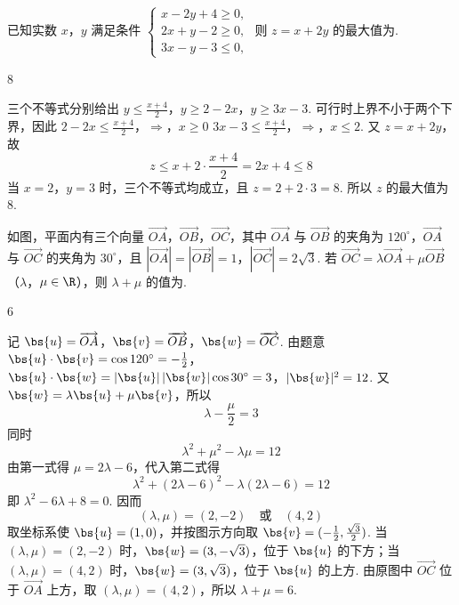 \begin{problem}
已知实数 \(x\)，\(y\) 满足条件 \(\begin{cases}
x - 2y + 4 \geqslant 0,\\
2x + y - 2 \geqslant 0,\\
3x - y - 3 \leqslant 0,
\end{cases}\) 则 \(z = x + 2y\) 的最大值为\fillinblank{}.
\end{problem}

\begin{answer}
\(8\)
\end{answer}

\begin{solution}
三个不等式分别给出 \(y\leqslant\frac{x+4}{2}\)，\(y\geqslant2-2x\)，\(y\geqslant3x-3\).
可行时上界不小于两个下界，因此
\(2-2x\leqslant\frac{x+4}{2}\)，\(\Longrightarrow\)，\(x\geqslant0\)
\(3x-3\leqslant\frac{x+4}{2}\)，\(\Longrightarrow\)，\(x\leqslant2\).
又 \(z=x+2y\)，故
\[
z\leqslant x+2\cdot\frac{x+4}{2}=2x+4\leqslant8
\]
当 \(x=2\)，\(y=3\) 时，三个不等式均成立，且 \(z=2+2\cdot3=8\). 所以 \(z\) 的最大值为 \(8\).
\end{solution}

\begin{problem}
如图，平面内有三个向量 \(\overrightarrow{OA}\)，\(\overrightarrow{OB}\)，\(\overrightarrow{OC}\)，其中 \(\overrightarrow{OA}\) 与 \(\overrightarrow{OB}\) 的夹角为 \(120^{\circ}\)，\(\overrightarrow{OA}\) 与 \(\overrightarrow{OC}\) 的夹角为 \(30^{\circ}\)，且 \(\left|\overrightarrow{OA}\right| = \left|\overrightarrow{OB}\right| = 1\)，\(\left|\overrightarrow{OC}\right| = 2\sqrt{3}\). 若 \(\overrightarrow{OC} = \lambda \overrightarrow{OA} + \mu \overrightarrow{OB}\)（\(\lambda\)，\(\mu \in \R\)），则 \(\lambda + \mu\) 的值为\fillinblank{}.
\end{problem}

\begin{answer}
\(6\)
\end{answer}

\begin{solution}
记 \(\bs{u}=\overrightarrow{OA}\)，\(\bs{v}=\overrightarrow{OB}\)，\(\bs{w}=\overrightarrow{OC}\). 由题意 \(\bs{u}\cdot\bs{v}=\cos120^{\circ}=-\frac12\)，\(\bs{u}\cdot\bs{w}=|\bs{u}|\,|\bs{w}|\cos30^{\circ}=3\)，\(|\bs{w}|^2=12\).
又 \(\bs{w}=\lambda\bs{u}+\mu\bs{v}\)，所以
\[
\lambda-\frac{\mu}{2}=3
\]
同时
\[
\lambda^2+\mu^2-\lambda\mu=12
\]
由第一式得 \(\mu=2\lambda-6\)，代入第二式得
\[
\lambda^2+(2\lambda-6)^2-\lambda(2\lambda-6)=12
\]
即 \(\lambda^2-6\lambda+8=0\). 因而
\[
(\lambda,\mu)=(2,-2)\quad\text{或}\quad(4,2)
\]
取坐标系使 \(\bs{u}=(1,0)\)，并按图示方向取 \(\bs{v}=(-\frac12,\frac{\sqrt3}{2})\). 当 \((\lambda,\mu)=(2,-2)\) 时，\(\bs{w}=(3,-\sqrt3)\)，位于 \(\bs{u}\) 的下方；当 \((\lambda,\mu)=(4,2)\) 时，\(\bs{w}=(3,\sqrt3)\)，位于 \(\bs{u}\) 的上方. 由原图中 \(\overrightarrow{OC}\) 位于 \(\overrightarrow{OA}\) 上方，取 \((\lambda,\mu)=(4,2)\)，所以 \(\lambda+\mu=6\).
\end{solution}

